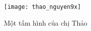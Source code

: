 \documentclass[a4paper]{report}
\begin{document}
\maketitle
\tableofcontents

%
%
%

% 





%


\begin{figure}[ht]
  \centering
  \texttt{[image: thao\_nguyen9x]}
  \caption{Một tấm hình của chị Thảo}
\end{figure}

\end{document}
